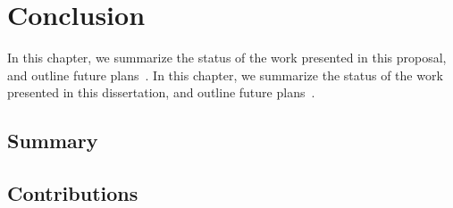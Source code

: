 \chapter{Conclusion\label{chap:conclusion}}

\if@ms
In this chapter, we summarize the status of the work presented in this proposal, and outline future plans~\cite{template}.
\else
In this chapter, we summarize the status of the work presented in this dissertation, and outline future plans~\cite{template}.
\fi

\section{Summary\label{sec:conclusion:summary}}

\lipsum{}

\section{Contributions\label{sec:conclusion:contributions}}

\lipsum{}
